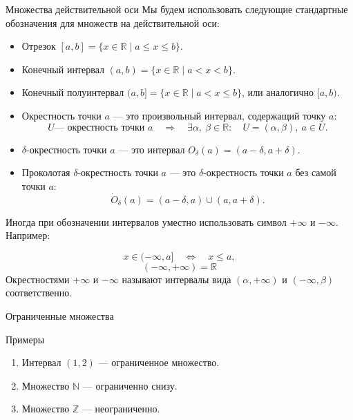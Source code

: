 \documentclass[8pt]{beamer}
\begin{document}
\begin{frame}{Множества действительной оси}
Мы будем использовать следующие стандартные обозначения для множеств на действительной оси:

\begin{itemize}
\item Отрезок $[a,b]=\{ x\in \mathbb{R} \mid a \le x \le b\}$.
\item Конечный интервал $(a,b)=\{ x\in \mathbb{R} \mid a < x < b\}$.
\item Конечный полуинтервал $(a,b]=\{ x\in \mathbb{R} \mid a < x \le b\}$, или аналогично $[a,b)$.
\item Окрестность точки $a$ --- это произвольный интервал, содержащий точку $a$:
$$U \text{--- окрестность точки $a$}\quad \Rightarrow \quad \exists \alpha,\ \beta\in\mathbb{R}:\quad U=(\alpha,\beta),\ a\in U.$$
\item $\delta$-окрестность точки $a$ --- это интервал $O_\delta(a)=(a-\delta, a+\delta)$.
\item Проколотая $\delta$-окрестность точки $a$ --- это $\delta$-окрестность точки $a$ без самой точки $a$:
$$\dot O_\delta(a)=(a-\delta,a) \cup (a, a+\delta).$$
\end{itemize}
\pause
Иногда при обозначении интервалов уместно использовать символ $+\infty$ и $-\infty$. Например:

$$x\in (-\infty , a] \quad \Leftrightarrow \quad x\le a,$$
$$(-\infty, +\infty) = \mathbb{R}$$
Окрестностями $+\infty$ и $-\infty$ называют интервалы вида $(\alpha,+\infty)$ и $(-\infty,\beta)$ соответственно.
\end{frame}

\begin{frame}{Ограниченные множества}
\pause
\begin{block}{Примеры}
\begin{enumerate}
\item Интервал $(1,2)$ --- ограниченное множество.
\item Множество $\mathbb{N}$ --- ограниченно  снизу.
\item Множество $\mathbb{Z}$ --- неограниченно.
\end{enumerate}
\end{block}
\end{frame}
\end{document}
